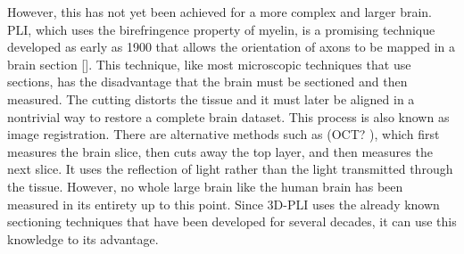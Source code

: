 However, this has not yet been achieved for a more complex and larger brain.
\ac{PLI}, which uses the birefringence property of myelin, is a promising technique developed as early as 1900 that allows the orientation of axons to be mapped in a brain section [\dummy{}].
This technique, like most microscopic techniques that use sections, has the disadvantage that the brain must be sectioned and then measured.
The cutting distorts the tissue and it must later be aligned in a nontrivial way to restore a complete brain dataset.
This process is also known as image registration.
There are alternative methods such as (OCT? \cite{Aumann2019}), which first measures the brain slice, then cuts away the top layer, and then measures the next slice. It uses the reflection of light rather than the light transmitted through the tissue.
However, no whole large brain like the human brain has been measured in its entirety up to this point.
Since \ac{3D-PLI} uses the already known sectioning techniques that have been developed for several decades, it can use this knowledge to its advantage.
%
% 
%

